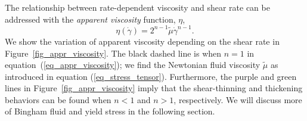 \par
The relationship between rate-dependent viscosity and shear rate can be addressed with the \textit{apparent viscosity} function, $\eta$,
\begin{equation}
  \eta(\dot{\gamma})
    =2^{n-1} \tilde{\mu} \dot{\gamma} ^{n-1}.
  \label{eq_appr_viscosity}
\end{equation}
We show the variation of apparent viscosity depending on the shear rate in Figure~\ref{fig_appr_viscosity}.
The black dashed line is when $n = 1$ in equation~(\ref{eq_appr_viscosity}); we find the Newtonian fluid viscosity $\tilde{\mu}$ as introduced in equation (\ref{eq_stress_tensor}). 
Furthermore, the purple and green lines in Figure~\ref{fig_appr_viscosity} imply that the shear-thinning and thickening behaviors can be found when $n < 1$ and $n>1$, respectively. 
We will discuss more of Bingham fluid and yield stress in the following section. 

